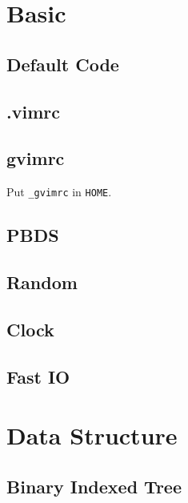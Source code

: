 \documentclass[twocolumn]{article}
\begin{document}
\setlength\parindent{0pt}

\tableofcontents

\pagestyle{fancy}
\fancyfoot{}
\fancyhead[R]{\thepage}

\section{Basic}

\subsection{Default Code}


\subsection{.vimrc}


\subsection{gvimrc}
Put \texttt{\_gvimrc} in \texttt{HOME}.


\subsection{PBDS}


\subsection{Random}


\subsection{Clock}


\subsection{Fast IO}


\section{Data Structure}

\subsection{Binary Indexed Tree}

\end{document}
